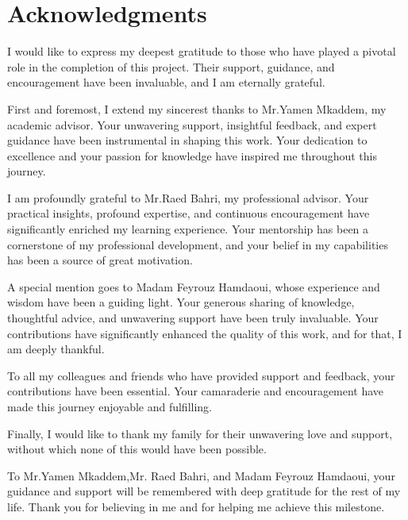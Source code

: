 \chapter*{Acknowledgments}


I would like to express my deepest gratitude to those who have played a pivotal role in the completion of this project. Their support, guidance, and encouragement have been invaluable, and I am eternally grateful.
\vspace{10pt}

First and foremost, I extend my sincerest thanks to Mr.Yamen Mkaddem, my academic advisor. Your unwavering support, insightful feedback, and expert guidance have been instrumental in shaping this work. Your dedication to excellence and your passion for knowledge have inspired me throughout this journey.
\vspace{10pt}

I am profoundly grateful to Mr.Raed Bahri, my professional advisor. Your practical insights, profound expertise, and continuous encouragement have significantly enriched my learning experience. Your mentorship has been a cornerstone of my professional development, and your belief in my capabilities has been a source of great motivation.
\vspace{10pt}

A special mention goes to Madam Feyrouz Hamdaoui, whose experience and wisdom have been a guiding light. Your generous sharing of knowledge, thoughtful advice, and unwavering support have been truly invaluable. Your contributions have significantly enhanced the quality of this work, and for that, I am deeply thankful.
\vspace{10pt}

To all my colleagues and friends who have provided support and feedback, your contributions have been essential. Your camaraderie and encouragement have made this journey enjoyable and fulfilling.
\vspace{10pt}

Finally, I would like to thank my family for their unwavering love and support, without which none of this would have been possible.
\vspace{10pt}

To Mr.Yamen Mkaddem,Mr. Raed Bahri, and Madam Feyrouz Hamdaoui, your guidance and support will be remembered with deep gratitude for the rest of my life. Thank you for believing in me and for helping me achieve this milestone.
